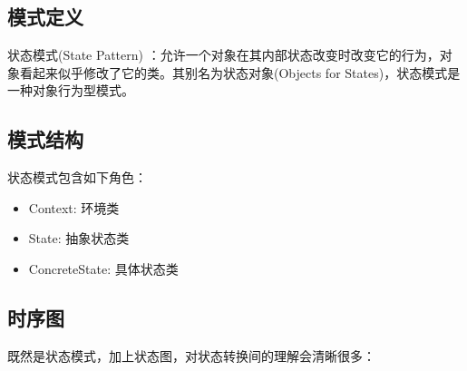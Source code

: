 \documentclass[letterpaper,10pt,english]{sphinxmanual}
\begin{document}
\subsection{模式定义}
\label{\detokenize{behavioral_patterns/state:id4}}
\sphinxAtStartPar
状态模式(State Pattern) ：允许一个对象在其内部状态改变时改变它的行为，对象看起来似乎修改了它的类。其别名为状态对象(Objects for States)，状态模式是一种对象行为型模式。


\subsection{模式结构}
\label{\detokenize{behavioral_patterns/state:id5}}
\sphinxAtStartPar
状态模式包含如下角色：
\begin{itemize}
\item {} 
\sphinxAtStartPar
Context: 环境类

\item {} 
\sphinxAtStartPar
State: 抽象状态类

\item {} 
\sphinxAtStartPar
ConcreteState: 具体状态类

\end{itemize}

\noindent{}


\subsection{时序图}
\label{\detokenize{behavioral_patterns/state:id6}}
\noindent{}

\sphinxAtStartPar
既然是状态模式，加上状态图，对状态转换间的理解会清晰很多：

\noindent{}
\end{document}
